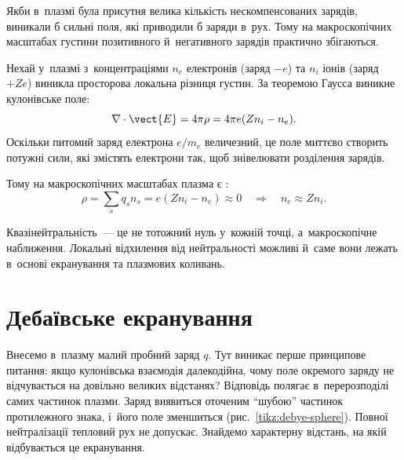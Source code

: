 Якби в~плазмі була присутня велика кількість нескомпенсованих зарядів, виникали б сильні
поля, які приводили б заряди в~рух. Тому на макроскопічних масштабах густини позитивного
й~негативного зарядів практично збігаються.

Нехай у~плазмі з~концентраціями $n_e$ електронів (заряд $-e$) та $n_i$ іонів (заряд $+Ze$)
виникла просторова локальна різниця густин. За теоремою Гаусса виникне кулонівське поле:
\begin{equation}
	\nabla \cdot \vect{E} = 4\pi \rho = 4\pi e (Z n_i - n_e).
\end{equation}
Оскільки питомий заряд електрона $e/m_e$ величезний, це поле миттєво створить потужні
сили, які змістять електрони так, щоб знівелювати розділення зарядів.

Тому на макроскопічних масштабах плазма є :
\begin{equation}\label{eq:quasineutrality}
	\rho = \sum_s q_s n_s = e(Z n_i - n_e) \approx 0 \quad \Rightarrow \quad n_e \approx Z n_i.
\end{equation}
\begin{Attention}
	Квазінейтральність~--- це не тотожний нуль у~кожній точці, а~макроскопічне наближення.
	Локальні відхилення від нейтральності можливі й~саме вони лежать в~основі екранування
	та плазмових коливань.
\end{Attention}



\section{Дебаївське екранування}



Внесемо в~плазму малий пробний заряд $q$. Тут виникає перше принципове питання: якщо
кулонівська взаємодія далекодійна, чому поле окремого заряду не відчувається на довільно
великих відстанях? Відповідь полягає в~перерозподілі самих частинок плазми. Заряд
виявиться оточеним \enquote{шубою} частинок протилежного знака, і~його поле зменшиться
(рис.~\ref{tikz:debye-sphere}). Повної нейтралізації тепловий рух не допускає. Знайдемо
характерну відстань, на якій відбувається це екранування.

